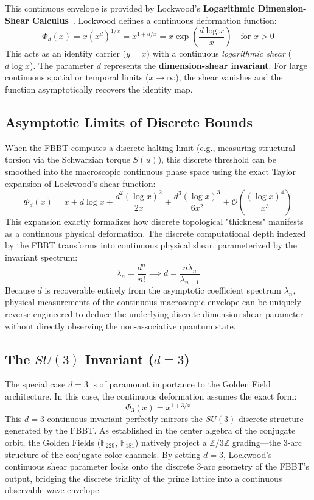 \documentclass[12pt,oneside]{article}
\theoremstyle{principia}
\theoremstyle{definition}
\theoremstyle{remark}
\begin{document}
This continuous envelope is provided by Lockwood's \textbf{Logarithmic Dimension-Shear Calculus}~\cite{lockwood_zpe2025}. Lockwood defines a continuous deformation function:
\begin{equation}
    \Phi_d(x) = x(x^d)^{1/x} = x^{1+d/x} = x \exp\left(\frac{d \log x}{x}\right) \quad \text{for } x > 0
\end{equation}
This acts as an identity carrier ($y = x$) with a continuous \textit{logarithmic shear} ($d \log x$). The parameter $d$ represents the \textbf{dimension-shear invariant}. For large continuous spatial or temporal limits ($x \to \infty$), the shear vanishes and the function asymptotically recovers the identity map.

\subsection{Asymptotic Limits of Discrete Bounds}
When the FBBT computes a discrete halting limit (e.g., measuring structural torsion via the Schwarzian torque $S(u)$), this discrete threshold can be smoothed into the macroscopic continuous phase space using the exact Taylor expansion of Lockwood's shear function:
\begin{equation}
    \Phi_d(x) = x + d \log x + \frac{d^2 (\log x)^2}{2x} + \frac{d^3 (\log x)^3}{6x^2} + \mathcal{O}\left(\frac{(\log x)^4}{x^3}\right)
\end{equation}
This expansion exactly formalizes how discrete topological "thickness" manifests as a continuous physical deformation. The discrete computational depth indexed by the FBBT transforms into continuous physical shear, parameterized by the invariant spectrum:
\begin{equation}
    \lambda_n = \frac{d^n}{n!} \implies d = \frac{n \lambda_n}{\lambda_{n-1}}
\end{equation}
Because $d$ is recoverable entirely from the asymptotic coefficient spectrum $\lambda_n$, physical measurements of the continuous macroscopic envelope can be uniquely reverse-engineered to deduce the underlying discrete dimension-shear parameter without directly observing the non-associative quantum state.

\subsection{The $SU(3)$ Invariant ($d=3$)}
The special case $d=3$ is of paramount importance to the Golden Field architecture. In this case, the continuous deformation assumes the exact form:
\begin{equation}
    \Phi_3(x) = x^{1+3/x}
\end{equation}
This $d=3$ continuous invariant perfectly mirrors the $SU(3)$ discrete structure generated by the FBBT. As established in the center algebra of the conjugate orbit, the Golden Fields ($\mathbb{F}_{229}$, $\mathbb{F}_{181}$) natively project a $\mathbb{Z}/3\mathbb{Z}$ grading---the 3-arc structure of the conjugate color channels. By setting $d=3$, Lockwood's continuous shear parameter locks onto the discrete 3-arc geometry of the FBBT's output, bridging the discrete triality of the prime lattice into a continuous observable wave envelope. 
\end{document}
